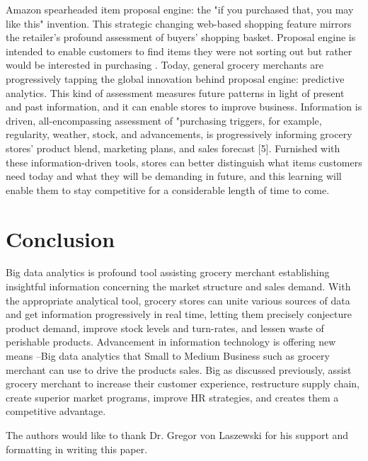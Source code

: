 \documentclass[sigconf]{acmart}
\begin{document}
Amazon spearheaded item proposal engine: the "if you purchased that, you may like this" invention. This strategic changing web-based shopping feature mirrors the retailer's profound assessment of buyers' shopping basket.  Proposal engine is intended to enable customers to find items they were not sorting out but rather would be interested in purchasing \cite{1}. Today, general grocery merchants are progressively tapping the global innovation behind proposal engine: predictive analytics. This kind of assessment measures future patterns in light of present and past information, and it can enable stores to improve business. Information is driven, all-encompassing assessment of "purchasing triggers, for example, regularity, weather, stock, and advancements, is progressively informing grocery stores' product blend, marketing plans, and sales forecast [5]. Furnished with these information-driven tools, stores can better distinguish what items customers need today and what they will be demanding in future, and this learning will enable them to stay competitive for a considerable length of time to come.  

\section{Conclusion}

Big data analytics is profound tool assisting grocery merchant establishing insightful information concerning the market structure and sales demand. With the appropriate analytical tool, grocery stores can unite various sources of data and get information progressively in real time, letting them precisely conjecture product demand, improve stock levels and turn-rates, and lessen waste of perishable products. Advancement in information technology is offering new means –Big data analytics that Small to Medium Business such as grocery merchant can use to drive the products sales. Big as discussed previously, assist grocery merchant to increase their customer experience, restructure supply chain, create superior market programs, improve HR strategies, and creates them a competitive advantage.

\begin{acks}

The authors would like to thank Dr. Gregor von Laszewski for his support and formatting in writing this paper.

\end{acks}

 
\end{document}
